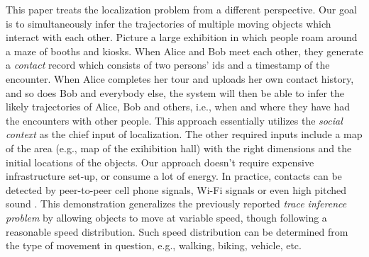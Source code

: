 This paper treats the localization problem from a different perspective. 
Our goal is to simultaneously infer the trajectories of multiple moving objects 
which interact with each other. Picture a large exhibition in which people
roam around a maze of booths and kiosks. When Alice and Bob meet each other, 
they generate a {\em contact} record which consists of two persons' 
ids and a timestamp of the encounter. 
When Alice completes her tour and uploads her own contact history, 
and so does Bob and everybody else, the system will then be able 
to infer the likely trajectories of Alice, Bob and others, i.e.,
when and where they have had the encounters with other people. 
This approach essentially utilizes the {\em social context} as the chief 
input of localization. The other required inputs include a map of the area 
(e.g., map of the exihibition hall) with the right dimensions and the initial 
locations of the objects. 
Our approach doesn't require expensive infrastructure set-up,
or consume a lot of energy. In practice, contacts can be detected by
peer-to-peer cell phone signals, Wi-Fi signals or even high pitched sound \cite{mobileUltraSound}.
This demonstration generalizes the previously reported
{\em trace inference problem} \cite{wang2011automatic} by allowing objects to
move at variable speed, though following a reasonable speed distribution. 
Such speed distribution can be determined from the type of movement in 
question, e.g., walking, biking, vehicle, etc.

%
